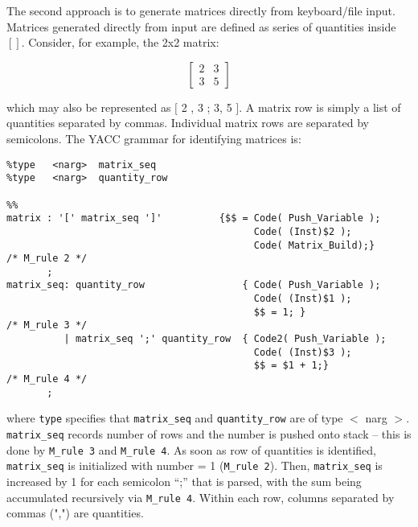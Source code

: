 \vspace{0.15 in}
\noindent\hspace{0.50 in}
The second approach is to generate matrices directly from keyboard/file input.
Matrices generated directly from input are defined as series of quantities inside $[ ]$.
Consider, for example, the 2x2 matrix:

\[ \left [
\begin{array}{rr}
 2  & 3  \\
 3  & 5 
\end{array}
\right ] \]

\vspace{0.15 in}\noindent
which may also be represented as $[$ 2 , 3 ; 3, 5 $]$.
A matrix row is simply a list of quantities separated by commas.
Individual matrix rows are separated by semicolons.
The YACC grammar for identifying matrices is:

\begin{footnotesize}
\begin{verbatim}
%type   <narg>  matrix_seq
%type   <narg>  quantity_row

%%
matrix : '[' matrix_seq ']'          {$$ = Code( Push_Variable );
                                           Code( (Inst)$2 );
                                           Code( Matrix_Build);}      /* M_rule 2 */
       ;
matrix_seq: quantity_row                 { Code( Push_Variable );
                                           Code( (Inst)$1 );
                                           $$ = 1; }                  /* M_rule 3 */
          | matrix_seq ';' quantity_row  { Code2( Push_Variable );
                                           Code( (Inst)$3 );
                                           $$ = $1 + 1;}              /* M_rule 4 */
       ;
\end{verbatim}
\end{footnotesize}

\vspace{0.05 in}\noindent
where {\tt type} specifies that {\tt matrix\_seq}
and {\tt quantity\_row} are of type $<$ narg $>$.
{\tt matrix\_seq} records number of rows and the number is pushed onto stack --
this is done by {\tt M\_rule 3} and {\tt M\_rule 4}.
As soon as row of quantities is identified,
{\tt matrix\_seq} is initialized with number = 1 ({\tt M\_rule 2}).
Then, {\tt matrix\_seq} is increased by 1 for
each semicolon ``;'' that is parsed,
with the sum being accumulated recursively via {\tt M\_rule 4}.
Within each row, columns separated by commas (",") are quantities.

